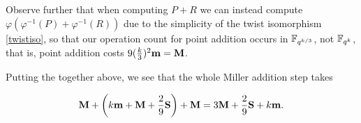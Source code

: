 Observe further that when computing $P+R$ we can instead compute
$\varphi(\varphi^{-1}(P) + \varphi^{-1}(R))$ due to the simplicity of the twist isomorphism \eqref{twistiso},
so that our operation count for point addition occurs in $\mathbb{F}_{q^{k/3}}$, not $\mathbb{F}_{q^k}$, that is,
point addition costs $9(\frac{k}{3})^2\textbf{m} = \textbf{M}$.

Putting the together above, we see that the whole Miller addition step takes

\[\textbf{M} + \left( k\textbf{m} + \textbf{M} + \frac{2}{9}\textbf{S} \right) + \textbf{M} = 3\textbf{M} + \frac{2}{9}\textbf{S} + k\textbf{m}.\]


